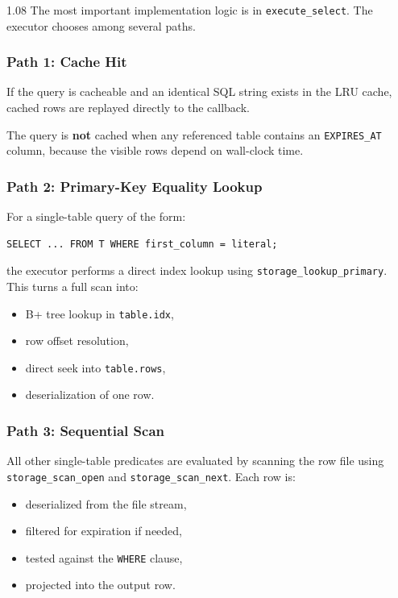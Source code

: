 \documentclass[11pt,a4paper]{article}
\begin{document}
\begin{spacing}{1.08}
The most important implementation logic is in \texttt{execute\_select}. The executor chooses among several paths.

\subsubsection{Path 1: Cache Hit}

If the query is cacheable and an identical SQL string exists in the LRU cache, cached rows are replayed directly to the callback.

The query is \textbf{not} cached when any referenced table contains an \texttt{EXPIRES\_AT} column, because the visible rows depend on wall-clock time.

\subsubsection{Path 2: Primary-Key Equality Lookup}

For a single-table query of the form:

\begin{lstlisting}
SELECT ... FROM T WHERE first_column = literal;
\end{lstlisting}

the executor performs a direct index lookup using \texttt{storage\_lookup\_primary}. This turns a full scan into:

\begin{itemize}
    \item B+ tree lookup in \texttt{table.idx},
    \item row offset resolution,
    \item direct seek into \texttt{table.rows},
    \item deserialization of one row.
\end{itemize}

\subsubsection{Path 3: Sequential Scan}

All other single-table predicates are evaluated by scanning the row file using \texttt{storage\_scan\_open} and \texttt{storage\_scan\_next}. Each row is:

\begin{itemize}
    \item deserialized from the file stream,
    \item filtered for expiration if needed,
    \item tested against the \texttt{WHERE} clause,
    \item projected into the output row.
\end{itemize}


\end{spacing}
\end{document}
